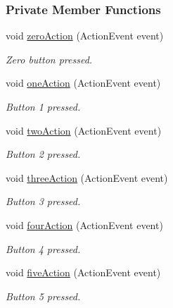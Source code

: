 \subsubsection*{Private Member Functions}
\begin{DoxyCompactItemize}
\item 
void \hyperlink{classGUI__Controller_a19c63367b86511e65296208c8cacb030}{zero\+Action} (Action\+Event event)
\begin{DoxyCompactList}\small\item\em Zero button pressed. \end{DoxyCompactList}\item 
void \hyperlink{classGUI__Controller_a90e608ef1790b4744312cafbb33d7d9c}{one\+Action} (Action\+Event event)
\begin{DoxyCompactList}\small\item\em Button \textquotesingle{}1\textquotesingle{} pressed. \end{DoxyCompactList}\item 
void \hyperlink{classGUI__Controller_a71317bb436ee46213733eaec13dd6ab8}{two\+Action} (Action\+Event event)
\begin{DoxyCompactList}\small\item\em Button \textquotesingle{}2\textquotesingle{} pressed. \end{DoxyCompactList}\item 
void \hyperlink{classGUI__Controller_a545e88d3e80c4b250eaa8254d18c43e6}{three\+Action} (Action\+Event event)
\begin{DoxyCompactList}\small\item\em Button \textquotesingle{}3\textquotesingle{} pressed. \end{DoxyCompactList}\item 
void \hyperlink{classGUI__Controller_a98a563cfbb9c2a951ee786d576a2329c}{four\+Action} (Action\+Event event)
\begin{DoxyCompactList}\small\item\em Button \textquotesingle{}4\textquotesingle{} pressed. \end{DoxyCompactList}\item 
void \hyperlink{classGUI__Controller_a9066c255f0d91d630948ab792319d59d}{five\+Action} (Action\+Event event)
\begin{DoxyCompactList}\small\item\em Button \textquotesingle{}5\textquotesingle{} pressed. \end{DoxyCompactList}\item 

\end{DoxyCompactItemize}

